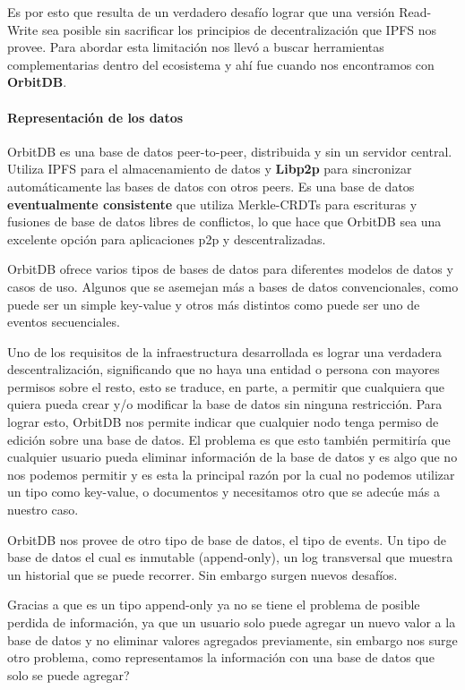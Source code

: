 Es por esto que resulta de un verdadero desafío lograr que una versión Read-Write sea posible sin sacrificar los principios de decentralización que IPFS nos provee. Para abordar esta limitación nos llevó a buscar herramientas complementarias dentro del ecosistema y ahí fue cuando nos encontramos con \textbf{OrbitDB}\cite{orbitdb}.

\paragraph{Representación de los datos}

OrbitDB es una base de datos peer-to-peer, distribuida y sin un servidor central. Utiliza IPFS para el almacenamiento de datos y \textbf{Libp2p}\cite{libp2p} para sincronizar automáticamente las bases de datos con otros peers. Es una base de datos \textbf{eventualmente consistente} que utiliza Merkle-CRDTs para escrituras y fusiones de base de datos libres de conflictos, lo que hace que OrbitDB sea una excelente opción para aplicaciones p2p y descentralizadas.

OrbitDB ofrece varios tipos de bases de datos para diferentes modelos de datos y casos de uso. Algunos que se asemejan más a bases de datos convencionales, como puede ser un simple key-value y otros más distintos como puede ser uno de eventos secuenciales.

Uno de los requisitos de la infraestructura desarrollada es lograr una verdadera descentralización, significando que no haya una entidad o persona con mayores permisos sobre el resto, esto se traduce, en parte, a permitir que cualquiera que quiera pueda crear y/o modificar la base de datos sin ninguna restricción. Para lograr esto, OrbitDB nos permite indicar que cualquier nodo tenga permiso de edición sobre una base de datos. El problema es que esto también permitiría que cualquier usuario pueda eliminar información de la base de datos y es algo que no nos podemos permitir y es esta la principal razón por la cual no podemos utilizar un tipo como key-value, o documentos y necesitamos otro que se adecúe más a nuestro caso.
 
OrbitDB nos provee de otro tipo de base de datos, el tipo de events. Un tipo de base de datos el cual es inmutable (append-only), un log transversal que muestra un historial que se puede recorrer. Sin embargo surgen nuevos desafíos.

Gracias a que es un tipo append-only ya no se tiene el problema de posible perdida de información, ya que un usuario solo puede agregar un nuevo valor a la base de datos y no eliminar valores agregados previamente, sin embargo nos surge otro problema, como representamos la información con una base de datos que solo se puede agregar?

